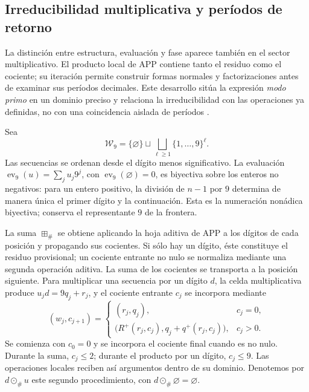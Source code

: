 \subsection{Irreducibilidad multiplicativa y períodos de retorno}
\label{primos-retornos}

La distinción entre estructura, evaluación y fase aparece también en el
sector multiplicativo. El producto local de APP contiene tanto el residuo
como el cociente; su iteración permite construir formas normales y
factorizaciones antes de examinar sus períodos decimales. Este desarrollo
sitúa la expresión \emph{modo primo} en un dominio preciso y relaciona la
irreducibilidad con las operaciones ya definidas, no con una coincidencia
aislada de períodos \cite{hmtintegral,hmtholonomia}.

Sea
\[
 \mathcal W_9=\{\varnothing\}\sqcup
 \bigsqcup_{\ell\geq1}\{1,\ldots,9\}^{\ell}.
\]
Las secuencias se ordenan desde el dígito menos significativo. La evaluación
\(\operatorname{ev}_9(u)=\sum_j u_j9^j\), con
\(\operatorname{ev}_9(\varnothing)=0\), es biyectiva sobre los enteros no
negativos: para un entero positivo, la división de \(n-1\) por \(9\)
determina de manera única el primer dígito y la continuación. Esta es la
numeración nonádica biyectiva; conserva el representante \(9\) de la
frontera.

La suma \(\boxplus_\#\) se obtiene aplicando la hoja aditiva de APP a los
dígitos de cada posición y propagando sus cocientes. Si sólo hay un dígito,
éste constituye el residuo provisional; un cociente entrante no nulo se
normaliza mediante una segunda operación aditiva. La suma de los
cocientes se transporta a la posición siguiente. Para multiplicar una
secuencia por un dígito \(d\), la celda multiplicativa produce
\(u_jd=9q_j+r_j\), y el cociente entrante \(c_j\) se incorpora mediante
\[
 (w_j,c_{j+1})=
 \begin{cases}
 (r_j,q_j),&c_j=0,\\
 \bigl(R^+(r_j,c_j),q_j+q^+(r_j,c_j)\bigr),&c_j>0.
 \end{cases}
\]
Se comienza con \(c_0=0\) y se incorpora el cociente final cuando es no
nulo. Durante la suma, \(c_j\leq2\); durante el producto por un dígito,
\(c_j\leq9\). Las operaciones locales reciben así argumentos dentro
de su dominio. Denotemos por \(d\odot_\#u\) este segundo procedimiento,
con \(d\odot_\#\varnothing=\varnothing\).

